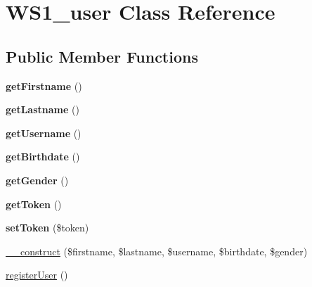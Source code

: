 \hypertarget{class_w_s1__user}{\section{W\+S1\+\_\+user Class Reference}
\label{class_w_s1__user}
}
\subsection*{Public Member Functions}
\begin{DoxyCompactItemize}
\item 
\hypertarget{class_w_s1__user_a42c9621713b6dcdfb9edd5a7630b6d93}{{\bfseries get\+Firstname} ()}\label{class_w_s1__user_a42c9621713b6dcdfb9edd5a7630b6d93}

\item 
\hypertarget{class_w_s1__user_a5d606fdf02d35b79b74b91a88c09000f}{{\bfseries get\+Lastname} ()}\label{class_w_s1__user_a5d606fdf02d35b79b74b91a88c09000f}

\item 
\hypertarget{class_w_s1__user_a81b37a3c9d639574e394f80c1138c75e}{{\bfseries get\+Username} ()}\label{class_w_s1__user_a81b37a3c9d639574e394f80c1138c75e}

\item 
\hypertarget{class_w_s1__user_aeafdb95ad7b97a5ff68ac785e8c243e5}{{\bfseries get\+Birthdate} ()}\label{class_w_s1__user_aeafdb95ad7b97a5ff68ac785e8c243e5}

\item 
\hypertarget{class_w_s1__user_af7313369f22d5c761e16462abe0c6ae1}{{\bfseries get\+Gender} ()}\label{class_w_s1__user_af7313369f22d5c761e16462abe0c6ae1}

\item 
\hypertarget{class_w_s1__user_a211a2979c22afcd7d9056a2bb55aa449}{{\bfseries get\+Token} ()}\label{class_w_s1__user_a211a2979c22afcd7d9056a2bb55aa449}

\item 
\hypertarget{class_w_s1__user_a354f01fe06936133696743e346fc206b}{{\bfseries set\+Token} (\$token)}\label{class_w_s1__user_a354f01fe06936133696743e346fc206b}

\item 
\hyperlink{class_w_s1__user_a718968fc81da151fcdbbdab7bc8e731f}{\+\_\+\+\_\+construct} (\$firstname, \$lastname, \$username, \$birthdate, \$gender)
\item 
\hyperlink{class_w_s1__user_a1fdb0f05b888f4aa92b319775e488e70}{register\+User} ()
\end{DoxyCompactItemize}
